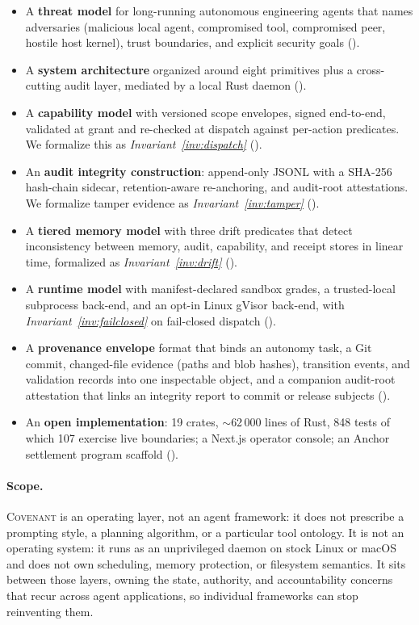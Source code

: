 \documentclass[11pt]{article}
\theoremstyle{plainsmall}
\begin{document}
\begin{itemize}[leftmargin=*,itemsep=2pt]
  \item A \textbf{threat model} for long-running autonomous engineering agents that names adversaries (malicious local agent, compromised tool, compromised peer, hostile host kernel), trust boundaries, and explicit security goals ().
  \item A \textbf{system architecture} organized around eight primitives plus a cross-cutting audit layer, mediated by a local Rust daemon ().
  \item A \textbf{capability model} with versioned scope envelopes, signed end-to-end, validated at grant and re-checked at dispatch against per-action predicates. We formalize this as \emph{Invariant~\ref{inv:dispatch}} ().
  \item An \textbf{audit integrity construction}: append-only JSONL with a SHA-256 hash-chain sidecar, retention-aware re-anchoring, and audit-root attestations. We formalize tamper evidence as \emph{Invariant~\ref{inv:tamper}} ().
  \item A \textbf{tiered memory model} with three drift predicates that detect inconsistency between memory, audit, capability, and receipt stores in linear time, formalized as \emph{Invariant~\ref{inv:drift}} ().
  \item A \textbf{runtime model} with manifest-declared sandbox grades, a trusted-local subprocess back-end, and an opt-in Linux gVisor back-end, with \emph{Invariant~\ref{inv:failclosed}} on fail-closed dispatch ().
  \item A \textbf{provenance envelope} format that binds an autonomy task, a Git commit, changed-file evidence (paths and blob hashes), transition events, and validation records into one inspectable object, and a companion audit-root attestation that links an integrity report to commit or release subjects ().
  \item An \textbf{open implementation}: 19 crates, $\sim$62\,000 lines of Rust, 848 tests of which 107 exercise live boundaries; a Next.js operator console; an Anchor settlement program scaffold ().
\end{itemize}

\paragraph{Scope.} \textsc{Covenant} is an operating layer, not an agent framework: it does not prescribe a prompting style, a planning algorithm, or a particular tool ontology. It is not an operating system: it runs as an unprivileged daemon on stock Linux or macOS and does not own scheduling, memory protection, or filesystem semantics. It sits between those layers, owning the state, authority, and accountability concerns that recur across agent applications, so individual frameworks can stop reinventing them.
\end{document}
